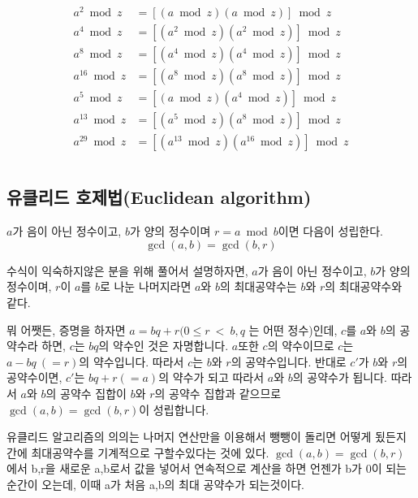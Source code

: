 \documentclass{oblivoir}
\begin{document}
\begin{align*}
    a^2 \bmod z & = [(a\bmod z)(a\bmod z)]\bmod z \\
    a^4 \bmod z & = [(a^2\bmod z)(a^2\bmod z)]\bmod z \\
    a^8 \bmod z & = [(a^4\bmod z)(a^4\bmod z)]\bmod z \\
    a^{16} \bmod z & = [(a^8 \bmod z)(a^8\bmod z)]\bmod z \\
    a^5 \bmod z & = [(a \bmod z)(a^4\bmod z)]\bmod z \\
    a^{13} \bmod z & = [(a^5\bmod z)(a^8\bmod z)]\bmod z \\ 
    a^{29} \bmod z & = [(a^{13}\bmod z)(a^{16}\bmod z)]\bmod z
\end{align*}

\newpage
\chapter{}
\section{유클리드 호제법(Euclidean algorithm)}
\begin{justbox}
$a$가 음이 아닌 정수이고, $b$가 양의 정수이며 $r=a \bmod b$이면 다음이 성립한다.
\[ \gcd(a,b) = \gcd(b,r) \]  
\end{justbox}
수식이 익숙하지않은 분을 위해 풀어서 설명하자면,
$a$가 음이 아닌 정수이고, $b$가 양의 정수이며, $r$이 $a$를 $b$로 나눈 나머지라면 $a$와 $b$의 최대공약수는 $b$와 $r$의 최대공약수와 같다.
\par
뭐 어쨋든, 증명을 하자면 $a=bq +r (0 \le r\: <\: b , q$ 는 어떤 정수)인데, $c$를 $a$와  $b$의 공약수라 하면, $c$는 $bq$의 약수인 것은 자명합니다.
$a$또한 $c$의 약수이므로 $c$는 $a-bq\:(=r)$의 약수입니다. 
따라서 $c$는 $b$와 $r$의 공약수입니다. 반대로 $c'$가 $b$와 $r$의 공약수이면, $c'$는 $bq+r(=a)$의 약수가 되고 따라서 $a$와 $b$의 공약수가 됩니다. 
따라서 $a$와 $b$의 공약수 집합이 $b$와 $r$의 공약수 집합과 같으므로 $\gcd(a,b) = \gcd(b,r)$이 성립합니다.

\vspace{1\baselineskip}

유클리드 알고리즘의 의의는 나머지 연산만을 이용해서 뺑뺑이 돌리면 어떻게 됬든지 간에 최대공약수를 기계적으로 구할수있다는 것에 있다. 
$\gcd(a,b) = \gcd(b,r)$에서 b,r을 새로운 a,b로서 값을 넣어서 연속적으로 계산을 하면 언젠가 b가 0이 되는 순간이 오는데,
이때 a가 처음 a,b의 최대 공약수가 되는것이다.

\newpage
\end{document}
